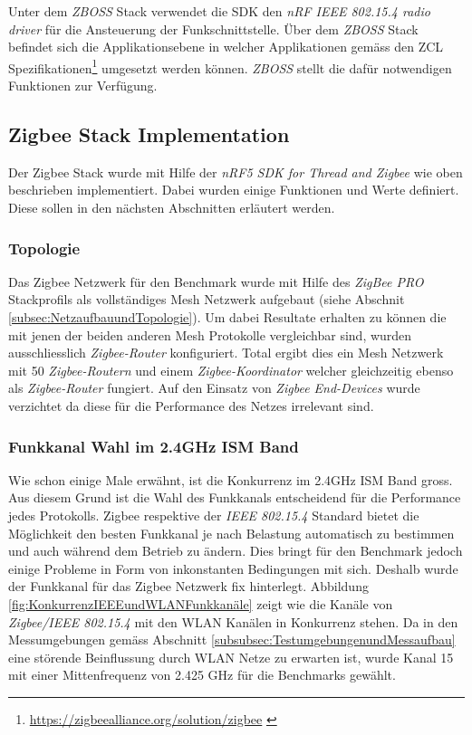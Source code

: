 Unter dem \textit{ZBOSS} Stack verwendet die SDK den \textit{nRF IEEE 802.15.4 radio driver} für die Ansteuerung der Funkschnittstelle.
Über dem \textit{ZBOSS} Stack befindet sich die Applikationsebene in welcher Applikationen gemäss den ZCL Spezifikationen\footnote{\url{https://zigbeealliance.org/solution/zigbee} \cite{the_zigbee_alliance_zigbee_2016}} umgesetzt werden können.
\textit{ZBOSS} stellt die dafür notwendigen Funktionen zur Verfügung.


\subsection{Zigbee Stack Implementation}\label{subsec:ZigbeeStackImplementation}
Der Zigbee Stack wurde mit Hilfe der \textit{nRF5 SDK for Thread and Zigbee} wie oben beschrieben implementiert.
Dabei wurden einige Funktionen und Werte definiert.
Diese sollen in den nächsten Abschnitten erläutert werden.

\subsubsection{Topologie}\label{subsubsec:ZigbeeTopologie}
Das Zigbee Netzwerk für den Benchmark wurde mit Hilfe des \textit{ZigBee PRO} Stackprofils als vollständiges Mesh Netzwerk aufgebaut (siehe Abschnit \ref{subsec:NetzaufbauundTopologie}).
Um dabei Resultate erhalten zu können die mit jenen der beiden anderen Mesh Protokolle vergleichbar sind, wurden ausschliesslich \textit{Zigbee-Router} konfiguriert.
Total ergibt dies ein Mesh Netzwerk mit 50 \textit{Zigbee-Routern} und einem \textit{Zigbee-Koordinator} welcher gleichzeitig ebenso als \textit{Zigbee-Router} fungiert.
Auf den Einsatz von \textit{Zigbee End-Devices} wurde verzichtet da diese für die Performance des Netzes irrelevant sind.

\subsubsection{Funkkanal Wahl im 2.4GHz ISM Band}\label{subsubsec:FunkkanalWahlim2.4GHzISMBand}
Wie schon einige Male erwähnt, ist die Konkurrenz im 2.4GHz ISM Band gross.
Aus diesem Grund ist die Wahl des Funkkanals entscheidend für die Performance jedes Protokolls.
Zigbee respektive der \textit{IEEE 802.15.4} Standard bietet die Möglichkeit den besten Funkkanal je nach Belastung automatisch zu bestimmen und auch während dem Betrieb zu ändern.
Dies bringt für den Benchmark jedoch einige Probleme in Form von inkonstanten Bedingungen mit sich.
Deshalb wurde der Funkkanal für das Zigbee Netzwerk fix hinterlegt.
Abbildung \ref{fig:KonkurrenzIEEEundWLANFunkkanäle} zeigt wie die Kanäle von \textit{Zigbee/IEEE 802.15.4} mit den WLAN Kanälen in Konkurrenz stehen.
Da in den Messumgebungen gemäss Abschnitt \ref{subsubsec:TestumgebungenundMessaufbau} eine störende Beinflussung durch WLAN Netze zu erwarten ist, wurde Kanal 15 mit einer Mittenfrequenz von 2.425 GHz für die Benchmarks gewählt.

